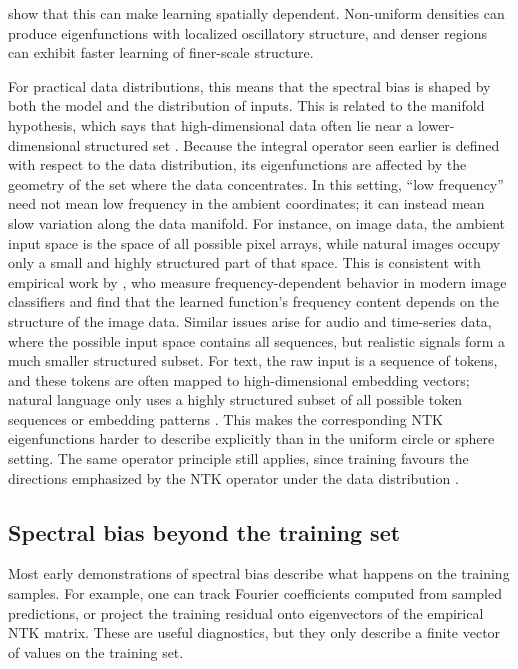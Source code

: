 \begin{revblock}
	\citet{basri2020frequencybiasneuralnetworks} show that this can make learning
	spatially dependent. Non-uniform densities can produce eigenfunctions with
	localized oscillatory structure, and denser regions can exhibit faster learning
	of finer-scale structure.

	For practical data distributions, this means that the spectral bias is shaped
	by both the model and the distribution of inputs. This is related to the
	manifold hypothesis, which says that high-dimensional data often lie near a
	lower-dimensional structured set \citep{fefferman2016testing}. Because the
	integral operator seen earlier is defined with respect to the data distribution, its
	eigenfunctions are affected by the geometry of the set where the data
	concentrates. In this setting, ``low frequency'' need not mean low frequency in
	the ambient coordinates; it can instead mean slow variation along the data
	manifold. For instance, on image data, the ambient input space is the space of
	all possible pixel arrays, while natural images occupy only a small and highly
	structured part of that space. This is consistent with empirical work by
	\citet{fridovich2022spectral}, who measure frequency-dependent behavior in
	modern image classifiers and find that the learned function's frequency content
	depends on the structure of the image data. Similar issues arise for audio and
	time-series data, where the possible input space contains all sequences, but
	realistic signals form a much smaller structured subset. For text, the raw
	input is a sequence of tokens, and these tokens are often mapped to
	high-dimensional embedding vectors; natural language only uses a highly
	structured subset of all possible token sequences or embedding patterns
	\citep{mikolov2013distributed}. This makes the corresponding NTK eigenfunctions
	harder to describe explicitly than in the uniform circle or sphere setting. The
	same operator principle still applies, since training favours the directions
	emphasized by the NTK operator under the data distribution
	\citep{bowman2022spectralbiasoutsidetraining,
		basri2020frequencybiasneuralnetworks}.

\end{revblock}

\subsection{Spectral bias beyond the training set}

Most early demonstrations of spectral bias describe what happens on the
training samples. For example, one can track Fourier coefficients computed from
sampled predictions, or project the training residual onto eigenvectors of the
empirical NTK matrix. These are useful diagnostics, but they only describe a
finite vector of values on the training set.

